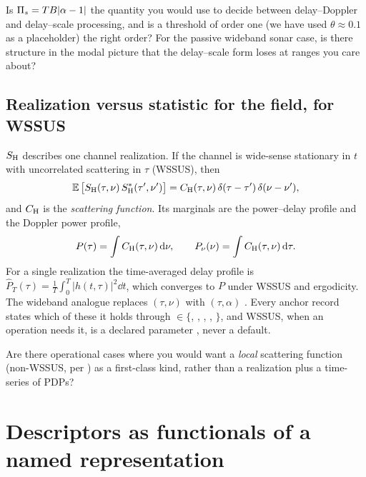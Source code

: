 \begin{question}
Is $\Pi_{s}=TB|\alpha-1|$ the quantity you would use to decide between delay--Doppler and delay--scale processing, and is a threshold of order one (we have used $\theta\approx0.1$ as a placeholder) the right order? For the passive wideband sonar case, is there structure in the modal picture that the delay--scale form loses at ranges you care about?
\end{question}

\subsection[Realization versus statistic]{Realization versus statistic\hfill{\normalfont\small \tagG{} for the field, \tagP{} for WSSUS}}

$S_{\mathrm{H}}$ describes one channel realization. If the channel is wide-sense stationary in $t$ with uncorrelated scattering in $\tau$ (WSSUS), then
\begin{equation}
  \operatorname{\mathbb{E}}\big[S_{\mathrm{H}}(\tau,\nu)\,S_{\mathrm{H}}^\ast(\tau',\nu')\big] = C_{\mathrm{H}}(\tau,\nu)\,\delta(\tau-\tau')\,\delta(\nu-\nu'),
  \label{eq:wssus}
\end{equation}
and $C_{\mathrm{H}}$ is the \emph{scattering function}. Its marginals are the power--delay profile and the Doppler power profile,
\begin{equation}
  P(\tau)=\int C_{\mathrm{H}}(\tau,\nu)\,\mathrm{d}\nu, \qquad P_\nu(\nu)=\int C_{\mathrm{H}}(\tau,\nu)\,\mathrm{d}\tau .
  \label{eq:pdp}
\end{equation}
For a single realization the time-averaged delay profile is $\hat P_T(\tau)=\frac1T\int_0^T|h(t,\tau)|^2\dd t$, which converges to $P$ under WSSUS and ergodicity. The wideband analogue replaces $(\tau,\nu)$ with $(\tau,\alpha)$ \citep{chude2011}. Every anchor record states which of these it holds through  $\in\{$, , , , $\}$, and WSSUS, when an operation needs it, is a declared parameter , never a default.

\begin{question}
Are there operational cases where you would want a \emph{local} scattering function (non-WSSUS, per \citealp{matz2011}) as a first-class kind, rather than a realization plus a time-series of PDPs?
\end{question}

\section{Descriptors as functionals of a named representation}
\label{sec:descriptors}


